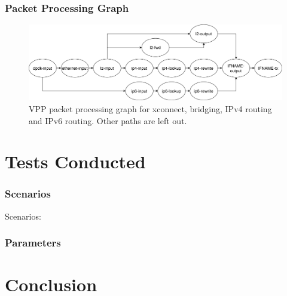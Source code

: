 \begin{frame}
    \frametitle{Packet Processing Graph}
    \begin{figure}
    \noindent\hspace{1mm}\includegraphics[width=\linewidth]{pics/vpp-nodes-horizontal.png}
    \caption{VPP packet processing graph for xconnect, bridging, IPv4 routing and IPv6 routing. Other paths are left out. }
    \label{nodegraph}
    \end{figure}
\end{frame}

\section{Tests Conducted}

\begin{frame}
    \frametitle{Scenarios}
    Scenarios:
    
\end{frame}

\begin{frame}
    \frametitle{Parameters}
\end{frame}

\section{Conclusion}


